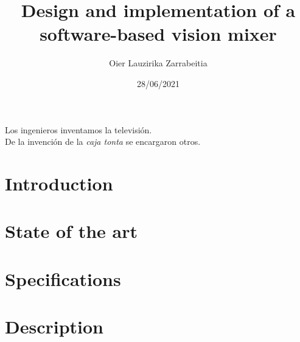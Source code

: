 \documentclass{etsist_pfg}
\title{Design and implementation of a software-based vision mixer}
\author{Oier Lauzirika Zarrabeitia}
\date{28/06/2021} %
\begin{document}


\thispagestyle{empty}\clearpage\null\newpage

\thispagestyle{empty}
\vspace*{\fill}
\begin{flushright}
Los ingenieros inventamos la televisión. \\
De la invención de la \textit{caja tonta} se encargaron otros.
\end{flushright}
\vspace*{\fill}
\newpage

\begin{otherlanguage}{spanish}
\begin{abstract}
    
\end{abstract}
\end{otherlanguage}

\begin{abstract}
    
\end{abstract}

\tableofcontents

\listoffigures

\listoftables

\printglossary[type=\acronymtype]

\chapter{Introduction}


\chapter{State of the art}


\chapter{Specifications}


\chapter{Description}

\end{document}

